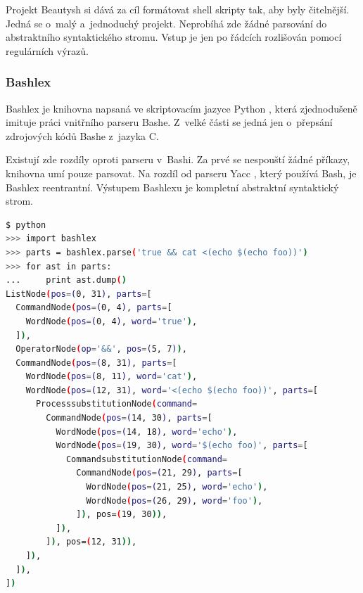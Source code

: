 \documentclass[thesis=M,czech]{FITthesis}[2012/06/26]
\begin{document}
Projekt Beautysh \cite{beautysh} si dává za cíl formátovat shell skripty tak, aby byly čitelnější. Jedná se o~malý a~jednoduchý projekt. Neprobíhá zde žádné parsování do abstraktního syntaktického stromu. Vstup je jen po řádcích rozlišován pomocí regulárních výrazů.






%
%
%
\subsubsection{Bashlex}\label{sec:bashlex}

Bashlex \cite{bashlex} je knihovna napsaná ve skriptovacím jazyce Python \cite{Python}, která zjednodušeně imituje práci vnitřního parseru Bashe. Z~velké části se jedná jen o~přepsání zdrojových kódů Bashe z~jazyka C.

Existují zde rozdíly oproti parseru v~Bashi. Za prvé se nespouští žádné příkazy, knihovna umí pouze parsovat. Na rozdíl od parseru Yacc \cite{yacc}, který používá Bash, je Bashlex reentrantní. Výstupem Bashlexu je kompletní abstraktní syntaktický strom.

\noindent
\begin{minipage}{\linewidth}
\begin{lstlisting}[language=bash, caption={Výstup z~knihovny Bashlex}, label={lst:bashlex}]
$ python
>>> import bashlex
>>> parts = bashlex.parse('true && cat <(echo $(echo foo))')
>>> for ast in parts:
...     print ast.dump()
ListNode(pos=(0, 31), parts=[
  CommandNode(pos=(0, 4), parts=[
    WordNode(pos=(0, 4), word='true'),
  ]),
  OperatorNode(op='&&', pos=(5, 7)),
  CommandNode(pos=(8, 31), parts=[
    WordNode(pos=(8, 11), word='cat'),
    WordNode(pos=(12, 31), word='<(echo $(echo foo))', parts=[
      ProcesssubstitutionNode(command=
        CommandNode(pos=(14, 30), parts=[
          WordNode(pos=(14, 18), word='echo'),
          WordNode(pos=(19, 30), word='$(echo foo)', parts=[
            CommandsubstitutionNode(command=
              CommandNode(pos=(21, 29), parts=[
                WordNode(pos=(21, 25), word='echo'),
                WordNode(pos=(26, 29), word='foo'),
              ]), pos=(19, 30)),
          ]),
        ]), pos=(12, 31)),
    ]),
  ]),
])
\end{lstlisting}
\end{minipage}
\end{document}
